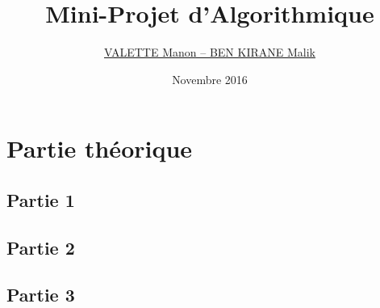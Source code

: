 \documentclass[a4paper,11pt]{article}
\title{Mini-Projet d'Algorithmique}
\author{
  \href{mailto:malikcpp@gmail.com,valette-manon@numericable.fr}{
    VALETTE Manon
    --
    BEN KIRANE Malik 
  }
}
\date{Novembre 2016}
\newcommand\csection[1]{{\centering\section{#1}\par}}
\begin{document}
\maketitle
\csection{Partie th\'eorique}
\subsection*{Partie 1}

\subsection*{Partie 2}

\pagebreak
\subsection*{Partie 3}

\end{document}
